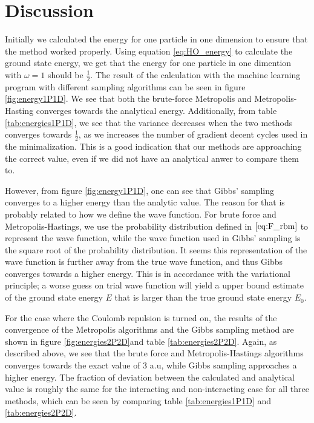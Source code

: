 \documentclass[norsk,a4paper,12pt]{article}
\begin{document}
\section{Discussion} \label{sec:Discussion}
Initially we calculated the energy for one particle in one dimension to ensure that the method worked properly. Using equation \ref{eq:HO_energy} to calculate the ground state energy, we get that the energy for one particle in one dimention with $\omega=1$ should be $\frac{1}{2}$. The result of the calculation with the machine learning program with different sampling algorithms can be seen in figure \ref{fig:energy1P1D}. We see that both the  brute-force Metropolis and Metropolis-Hasting converges towards the analytical energy. Additionally, from table \ref{tab:energies1P1D}, we see that the variance decreases when the two methods converges towards $\frac{1}{2}$, as we increases the number of gradient decent cycles used in the minimalization. This is a good indication that our methods are approaching the correct value, even if we did not have an analytical anwer to compare them to.
\par 
\vspace{3mm}

However, from figure \ref{fig:energy1P1D}, one can see that Gibbs' sampling converges to a higher energy than the analytic value. The reason for that is probably related to how we define the wave function. For brute force and Metropolis-Hastings, we use the probability distribution defined in $\ref{eq:F_rbm}$ to represent the wave function, while the wave function used in Gibbs' sampling is the square root of the probability distribution. It seems this representation of the wave function is further away from the true wave function, and thus Gibbs converges towards a higher energy. This is in accordance with the variational principle; a worse guess on trial wave function will yield a upper bound estimate of the ground state energy $E$ that is larger than the true ground state energy $E_0$.

\par 
\vspace{3mm}
For the case where the Coulomb repulsion is turned on, the results of the convergence of the Metropolis algorithms and the Gibbs sampling method are shown in figure \ref{fig:energies2P2D}and table \ref{tab:energies2P2D}. Again, as described above, we see that the brute force and Metropolis-Hastings algorithms converges towards the exact value of $3$ a.u, while Gibbs sampling approaches a higher energy. The fraction of deviation between the calculated and analytical value is roughly the same for the interacting and non-interacting case for all three methods, which can be seen by comparing table \ref{tab:energies1P1D} and \ref{tab:energies2P2D}.
\end{document}
